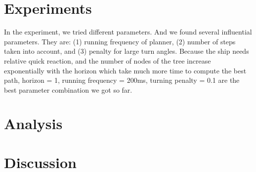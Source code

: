 \documentclass[10pt,draft,conference]{IEEEtran}
\begin{document}
\section{Experiments}

In the experiment, we tried different parameters. And we found several influential parameters. They are: (1) running frequency of planner, (2) number of steps taken into account, and (3) penalty for large turn angles. Because the ship needs relative quick reaction, and the number of nodes of the tree increase exponentially with the horizon which take much more time to compute the best path, horizon = 1, running frequency = 200ms, turning penalty = 0.1 are the best parameter combination we got so far. 


\section{Analysis}


\section{Discussion}




\end{document}

